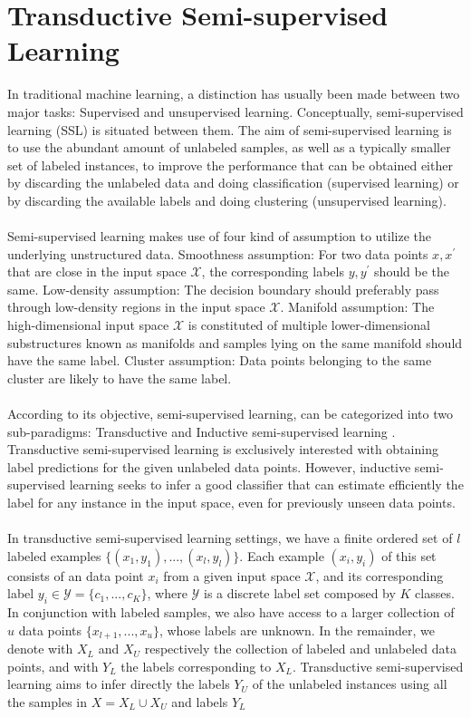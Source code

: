 \documentclass[conference]{IEEEtran}
\begin{document}
\section{Transductive Semi-supervised Learning}
In traditional machine learning, a distinction has usually been made between two major tasks: Supervised and unsupervised learning. Conceptually, semi-supervised learning (SSL) \cite{zhu2005semi} is  situated between them. The aim of semi-supervised learning is to use the abundant amount of unlabeled samples, as well as a typically smaller set of labeled instances, to improve the performance that can be obtained either by discarding the unlabeled data and doing classification (supervised learning) or by discarding the available labels and doing clustering (unsupervised learning). 
\\
\\ Semi-supervised learning makes use of four kind of assumption to utilize the underlying unstructured data. Smoothness assumption: For two data points $x, x^{'}$ that are close in the input space $\mathcal{X}$, the corresponding labels $y, y^{'}$ should be the same. Low-density assumption: The decision boundary should preferably pass through low-density regions in the input space $\mathcal{X}$. Manifold assumption: The high-dimensional input space $\mathcal{X}$ is constituted of multiple lower-dimensional substructures known as manifolds and samples lying on the same manifold should have the same label. Cluster assumption: Data points belonging to the same cluster are likely to have the same label.
\\
\\ According to its objective, semi-supervised learning, can be categorized into two sub-paradigms: Transductive and Inductive semi-supervised learning \cite{van2020survey}. Transductive semi-supervised learning is exclusively interested with obtaining label predictions for the given unlabeled data points. However, inductive semi-supervised learning seeks to  infer a good classifier that can estimate efficiently the label for any instance in the input space, even for previously unseen data points.
\\
\\ In transductive semi-supervised learning settings, we have a finite ordered set of $l$ labeled examples $\{(x_1,y_1),...,(x_l,y_l)\}$. Each example $(x_i,y_i)$ of this set consists of an data point $x_i$ from a given input space $\mathcal{X}$, and its corresponding label $y_i \in \mathcal{Y} = \{c_1,...,c_K\}$, where $\mathcal{Y}$ is a discrete label set composed by $K$ classes. In conjunction with labeled samples, we also have access to a larger collection of $u$ data points $\{x_{l+1},...,x_u\}$, whose labels are unknown. In the remainder, we denote with $X_L$ and $X_U$ respectively the collection of labeled and unlabeled data points, and with $Y_L$ the labels corresponding to $X_L$. Transductive semi-supervised learning aims to infer directly the labels $Y_U$ of the unlabeled instances using all the samples in $X=X_L \cup X_U$ and labels $Y_L$
\end{document}
